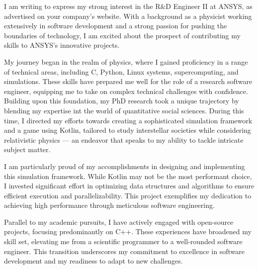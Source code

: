 \documentclass[11pt, a4paper]{awesome-cv}
\begin{document}
\makecvheader[R]

\makecvfooter
  {}%
  {}%
  {}

\makelettertitle

\begin{cvletter}


I am writing to express my strong interest in the R\&D Engineer II at ANSYS, as advertised on your company's website. With a background as a physicist working extensively in software development and a strong passion for pushing the boundaries of technology, I am excited about the prospect of contributing my skills to ANSYS's innovative projects.

My journey began in the realm of physics, where I gained proficiency in a range of technical areas, including C, Python, Linux systems, supercomputing, and simulations. These skills have prepared me well for the role of a research software engineer, equipping me to take on complex technical challenges with confidence. Building upon this foundation, my PhD research took a unique trajectory by blending my expertise int the world of quantitative social sciences. During this time, I directed my efforts towards creating a sophisticated simulation framework and a game using Kotlin, tailored to study interstellar societies while considering relativistic physics — an endeavor that speaks to my ability to tackle intricate subject matter.

I am particularly proud of my accomplishments in designing and implementing this simulation framework. While Kotlin may not be the most performant choice, I invested significant effort in optimizing data structures and algorithms to ensure efficient execution and parallelizability. This project exemplifies my dedication to achieving high performance through meticulous software engineering.

Parallel to my academic pursuits, I have actively engaged with open-source projects, focusing predominantly on C++. These experiences have broadened my skill set, elevating me from a scientific programmer to a well-rounded software engineer. This transition underscores my commitment to excellence in software development and my readiness to adapt to new challenges.


\end{cvletter}
\end{document}

